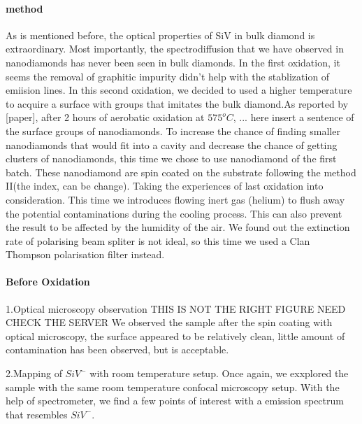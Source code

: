 \paragraph{method} As is mentioned before, the optical properties of SiV in bulk diamond is extraordinary. Most importantly, the spectrodiffusion that we have observed in nanodiamonds has never been seen in bulk diamonds. In the first oxidation, it seems the removal of graphitic impurity didn't help with the stablization of emiision lines. In this second oxidation, we decided to used a higher temperature to acquire a surface with groups that imitates the bulk diamond.As reported by [paper], after 2 hours of aerobatic oxidation at $575^{o}C$, ... here insert a sentence of the surface groups of nanodiamonds. To increase the chance of finding smaller nanodiamonds that would fit into a cavity and decrease the chance of getting clusters of nanodiamonds, this time we chose to use nanodiamond of the first batch. These nanodiamond are spin coated on the substrate following the method II(the index, can be change).
Taking the experiences of last oxidation into consideration. This time we introduces flowing inert gas (helium) to flush away the potential contaminations during the cooling process. This can also prevent the result to be affected by the humidity of the air.
We found out the extinction rate of polarising beam spliter is not ideal, so this time we used a Clan Thompson polarisation filter instead.

\paragraph{Before Oxidation}
1.Optical microscopy observation
THIS IS NOT THE RIGHT FIGURE NEED CHECK THE SERVER
We observed the sample after the spin coating with optical microscopy, the surface appeared to be relatively clean, little amount of contamination has been observed, but is acceptable.

2.Mapping of $SiV^{-}$ with room temperature setup.
Once again, we exxplored the sample with the same room temperature confocal microscopy setup. With the help of spectrometer, we find a few points of interest with a emission spectrum that resembles $SiV^{-}$. 

